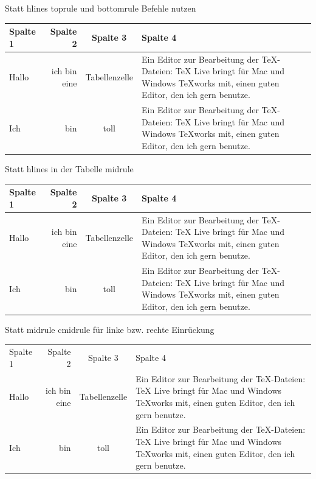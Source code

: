 \documentclass[ngerman,12pt]{scrartcl}
\begin{document}
\vspace*{1cm}

Statt hlines toprule und bottomrule Befehle nutzen

\vspace*{1cm}

\begin{tabular}{lrcp{6cm}} \toprule[1.5pt]
Spalte 1 & Spalte 2 & Spalte 3 & Spalte 4 \\ \hline
Hallo & ich bin eine & Tabellenzelle & Ein Editor zur Be\-ar\-beitung der TeX-Dateien: TeX Live bringt für Mac und Windows TeXworks mit, einen guten Editor, den ich gern benutze.  \\ \hline
Ich & bin & toll & Ein Editor zur Bearbeitung der TeX-Dateien: TeX Live bringt für Mac und Windows TeXworks mit, einen guten Editor, den ich gern benutze.  \\ \bottomrule[2.5pt]
\end{tabular}

\vspace*{1cm}

Statt hlines in der Tabelle midrule

\pagebreak

\begin{tabular}{lrcp{6cm}} \toprule[1.5pt]
Spalte 1 & Spalte 2 & Spalte 3 & Spalte 4 \\ \midrule
Hallo & ich bin eine & Tabellenzelle & Ein Editor zur Be\-ar\-beitung der TeX-Dateien: TeX Live bringt für Mac und Windows TeXworks mit, einen guten Editor, den ich gern benutze.  \\ \midrule
Ich & bin & toll & Ein Editor zur Bearbeitung der TeX-Dateien: TeX Live bringt für Mac und Windows TeXworks mit, einen guten Editor, den ich gern benutze.  \\ \bottomrule[2.5pt]
\end{tabular}

\vspace*{1cm}

Statt midrule cmidrule für linke bzw. rechte Einrückung

\vspace*{1cm}

\begin{tabular}{lrcp{6cm}} \toprule[1.5pt]
Spalte 1 & Spalte 2 & Spalte 3 & Spalte 4 \\ \cmidrule[1pt](rl){1-4}
Hallo & ich bin eine & Tabellenzelle & Ein Editor zur Be\-ar\-beitung der TeX-Dateien: TeX Live bringt für Mac und Windows TeXworks mit, einen guten Editor, den ich gern benutze.  \\ \cmidrule[1pt](rl){1-4}
Ich & bin & toll & Ein Editor zur Bearbeitung der TeX-Dateien: TeX Live bringt für Mac und Windows TeXworks mit, einen guten Editor, den ich gern benutze.  \\ \bottomrule[2.5pt]
\end{tabular}
\end{document}

